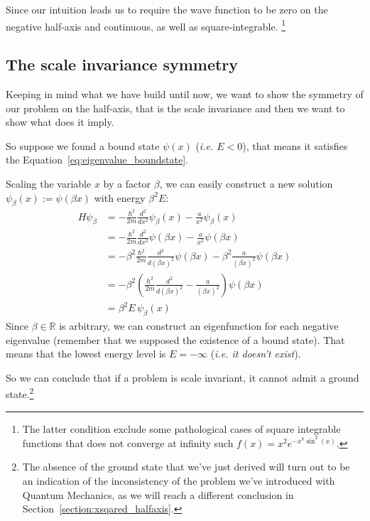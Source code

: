 \noindent
Since our intuition leads us to require the wave function to be zero on the negative half-axis and continuous, as well as square-integrable.
\footnote{The latter condition exclude some pathological cases of square integrable functions that does not converge at infinity such $f(x) = x^2 e^{-x^8 \sin^2(x)}$.}

\subsection{The scale invariance symmetry}
Keeping in mind what we have build until now, we want to show the symmetry of our problem on the half-axis, that is the scale invariance and then we want to show what does it imply.

So suppose we found a bound state $\psi(x)$ (\textit{i.e. $E<0$}), that means it satisfies the Equation~\eqref{eq:eigenvalue_boundstate}.

Scaling the variable $x$ by a factor $\beta$, we can easily construct a new solution $\psi_\beta (x) := \psi (\beta x)$ with energy $\beta^2 E$:
\begin{align*}
    H \psi_\beta
     & = - \frac{\hbar^2}{2m} \frac{d^2}{dx^2}\psi_\beta(x) - \frac{a}{x^2} \psi_\beta(x)                                  \\
     & = - \frac{\hbar^2}{2m} \frac{d^2}{dx^2}\psi(\beta x) - \frac{a}{x^2} \psi(\beta x)                                  \\
     & = - \beta^2 \frac{\hbar^2}{2m} \frac{d^2}{d(\beta x)^2} \psi(\beta x) - \beta^2 \frac{a}{(\beta x)^2} \psi(\beta x) \\
     & = - \beta^2 \left(\frac{\hbar^2}{2m} \frac{d^2}{d(\beta x)^2} - \frac{a}{(\beta x)^2}\right) \psi(\beta x) \\
     & = \beta^2 E \, \psi_\beta (x)
\end{align*}
Since $\beta \in \mathbb{R}$ is arbitrary, we can construct an eigenfunction for each negative eigenvalue (remember that we supposed the existence of a bound state). That means that the lowest energy level is $E = -\infty$ (\textit{i.e. it doesn't exist}).

So we can conclude that if a problem is scale invariant, it cannot admit a ground state.\footnote{The absence of the ground state that we've just derived will turn out to be an indication of the inconsistency of the problem we've introduced with Quantum Mechanics, as we will reach a different conclusion in Section~\ref{section:xsqared_halfaxis}.}

